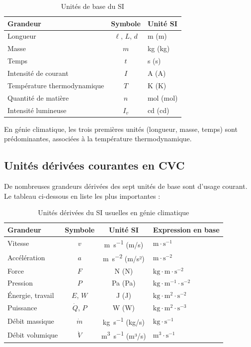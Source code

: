 \begin{table}[h]
  \centering
  \sffamily
  \caption{Unités de base du SI}
  \label{tab:unite-base}
  \begin{tabular}{|l|c|l|}
    \hline
    \textbf{Grandeur} & \textbf{Symbole} & \textbf{Unité SI} \\
    \hline
    Longueur & $\ell$, $L$, $d$ & \si{\meter} (m) \\
    Masse & $m$ & \si{\kilogram} (kg) \\
    Temps & $t$ & \si{\second} (s) \\
    Intensité de courant & $I$ & \si{\ampere} (A) \\
    Température thermodynamique & $T$ & \si{\kelvin} (K) \\
    Quantité de matière & $n$ & \si{\mole} (mol) \\
    Intensité lumineuse & $I_v$ & \si{\candela} (cd) \\
    \hline
  \end{tabular}
\end{table}

En génie climatique, les trois premières unités (longueur, masse, temps) sont prédominantes,
associées à la température thermodynamique.

\subsection{Unités dérivées courantes en CVC}

De nombreuses grandeurs dérivées des sept unités de base sont d'usage courant. Le tableau
ci-dessous en liste les plus importantes :

\begin{table}[h]
  \centering
  \sffamily
  \caption{Unités dérivées du SI usuelles en génie climatique}
  \label{tab:unite-derivee}
  \begin{tabular}{|l|c|c|l|}
    \hline
    \textbf{Grandeur} & \textbf{Symbole} & \textbf{Unité SI} & \textbf{Expression en base} \\
    \hline
    Vitesse & $v$ & \si{\meter\per\second} (m/s) & $\mathrm{m \cdot s^{-1}}$ \\
    Accélération & $a$ & \si{\meter\per\second\squared} (m/s²) & $\mathrm{m \cdot s^{-2}}$ \\
    Force & $F$ & \si{\newton} (N) & $\mathrm{kg \cdot m \cdot s^{-2}}$ \\
    Pression & $P$ & \si{\pascal} (Pa) & $\mathrm{kg \cdot m^{-1} \cdot s^{-2}}$ \\
    Énergie, travail & $E$, $W$ & \si{\joule} (J) & $\mathrm{kg \cdot m^2 \cdot s^{-2}}$ \\
    Puissance & $\dot{Q}$, $P$ & \si{\watt} (W) & $\mathrm{kg \cdot m^2 \cdot s^{-3}}$ \\
    Débit massique & $\dot{m}$ & \si{\kilogram\per\second} (kg/s) & $\mathrm{kg \cdot s^{-1}}$ \\
    Débit volumique & $\dot{V}$ & \si{\meter\cubed\per\second} (m³/s) & $\mathrm{m^3 \cdot s^{-1}}$ \\
    \hline
  \end{tabular}
\end{table}

